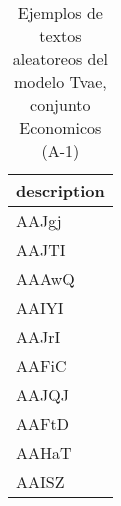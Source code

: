 \begin{table}[H]
\centering
\fontsize{8}{14}\selectfont
\caption{Ejemplos de textos aleatoreos del modelo Tvae, conjunto Economicos (A-1)}
\label{table-sample10-economicos-a-1-tvae-text}
\begin{tabular}{|m{50em}|}
\hline
\rowcolor[gray]{0.8}
description \\
\hline AAJgj \\
\hline AAJTI \\
\hline AAAwQ \\
\hline AAIYI \\
\hline AAJrI \\
\hline AAFiC \\
\hline AAJQJ \\
\hline AAFtD \\
\hline AAHaT \\
\hline AAISZ \\
\hline
\end{tabular}
\end{table}
